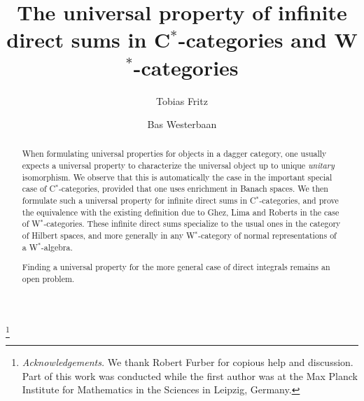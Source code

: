 \documentclass[reqno,T1,11pt]{amsproc}
\theoremstyle{plain}
\theoremstyle{remark}
\numberwithin{equation}{section}
\begin{document}
\sloppy

\setlength{\jot}{6pt}



\title[Infinite direct sums in C$^*$-categories and W$^*$-categories]{The universal property of infinite direct sums in C$^*$-categories and W$^*$-categories}

\author{Tobias Fritz}
\author{Bas Westerbaan}

\address{Perimeter Institute for Theoeretical Physics, Waterloo, Ontario, Canada}

\address{Institute for Computing and Information Sciences, Radboud Universiteit Nijmegen, The Netherlands}

\keywords{}


\thanks{\textit{Acknowledgements.} We thank Robert Furber for copious help and discussion. Part of this work was conducted while the first author was at the Max Planck Institute for Mathematics in the Sciences in Leipzig, Germany.}

\begin{abstract}
When formulating universal properties for objects in a dagger category, one usually expects a universal property to characterize the universal object up to unique \emph{unitary} isomorphism. We observe that this is automatically the case in the important special case of C$^*$-categories, provided that one uses enrichment in Banach spaces. We then formulate such a universal property for infinite direct sums in C$^*$-categories, and prove the equivalence with the existing definition due to Ghez, Lima and Roberts in the case of W$^*$-categories. These infinite direct sums specialize to the usual ones in the category of Hilbert spaces, and more generally in any W$^*$-category of normal representations of a W$^*$-algebra.

Finding a universal property for the more general case of direct integrals remains an open problem.
\end{abstract}

\maketitle
\end{document}
